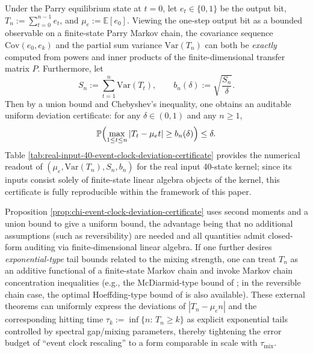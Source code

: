 

\begin{remark}\label{prop:chi-event-clock-deviation-certificate}
Under the Parry equilibrium state at $t=0$, let $e_t\in\{0,1\}$ be the output bit, $T_n:=\sum_{t=0}^{n-1}e_t$, and $\mu_e:=\mathbb{E}[e_0]$.
Viewing the one-step output bit as a bounded observable on a finite-state Parry Markov chain, the covariance sequence
\(
\mathrm{Cov}(e_0,e_k)
\)
and the partial sum variance
\(
\mathrm{Var}(T_n)
\)
can both be \emph{exactly} computed from powers and inner products of the finite-dimensional transfer matrix $P$.
Furthermore, let
$$
S_n:=\sum_{t=1}^{n}\mathrm{Var}(T_t),\qquad b_n(\delta):=\sqrt{\frac{S_n}{\delta}}.
$$
Then by a union bound and Chebyshev's inequality, one obtains an auditable uniform deviation certificate: for any $\delta\in(0,1)$ and any $n\ge 1$,
$$
\mathbb{P}\Bigl(\max_{1\le t\le n}|T_t-\mu_e t|\ge b_n(\delta)\Bigr)\le \delta.
$$
Table \ref{tab:real-input-40-event-clock-deviation-certificate} provides the numerical readout of $(\mu_e,\mathrm{Var}(T_n),S_n,b_n)$ for the real input 40-state kernel; since its inputs consist solely of finite-state linear algebra objects of the kernel, this certificate is fully reproducible within the framework of this paper.
\end{remark}

\begin{remark}
Proposition \ref{prop:chi-event-clock-deviation-certificate} uses second moments and a union bound to give a uniform bound, the advantage being that no additional assumptions (such as reversibility) are needed and all quantities admit closed-form auditing via finite-dimensional linear algebra.
If one further desires \emph{exponential-type} tail bounds related to the mixing strength, one can treat $T_n$ as an additive functional of a finite-state Markov chain and invoke Markov chain concentration inequalities (e.g., the McDiarmid-type bound of \cite{Paulin2015MarkovConcentration}; in the reversible chain case, the optimal Hoeffding-type bound of \cite{LeonPerron2004OptimalHoeffding} is also available).
These external theorems can uniformly express the deviations of $|T_n-\mu_e n|$ and the corresponding hitting time $\tau_k:=\inf\{n:\,T_n\ge k\}$ as explicit exponential tails controlled by spectral gap/mixing parameters, thereby tightening the error budget of ``event clock rescaling'' to a form comparable in scale with $\tau_{\mathrm{mix}}$.
\end{remark}

